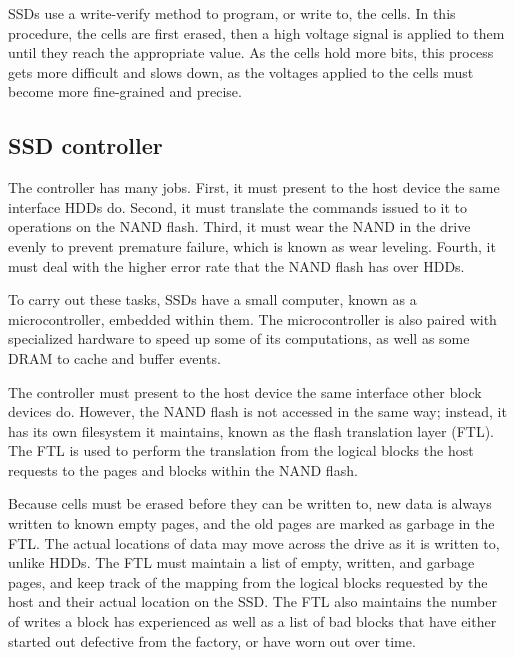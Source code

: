 \documentclass[format=acmsmall, review=false, screen=true]{acmart}
\begin{document}
SSDs use a write-verify method to program, or write to, the cells. In this procedure, the cells are first erased, then 
a high voltage signal is applied to them until they reach the appropriate value. As the cells hold more bits, this 
process gets more difficult and slows down, as the voltages applied to the cells must become more fine-grained and precise.
\cite{Dirik2009, Cornwell2012, Micheloni2013, Chen2016}

\subsection{SSD controller}

The controller has many jobs. First, it must present to the host device the same interface HDDs do. Second, it must 
translate the commands issued to it to operations on the NAND flash. Third, it must wear the NAND in the drive evenly 
to prevent premature failure, which is known as wear leveling. Fourth, it must deal with the higher error rate that 
the NAND flash has over HDDs. \cite{Dirik2009, Cornwell2012, Micheloni2013, MatejFucek2014, Chen2016}

To carry out these tasks, SSDs have a small computer, known as a microcontroller, embedded within them. The microcontroller 
is also paired with specialized hardware to speed up some of its computations, as well as some DRAM to cache and buffer 
events. \cite{Dirik2009, Cornwell2012, Micheloni2013, MatejFucek2014, Chen2016}

The controller must present to the host device the same interface other block devices do. However, the NAND flash is not 
accessed in the same way; instead, it has its own filesystem it maintains, known as the flash translation layer (FTL). 
The FTL is used to perform the translation from the logical blocks the host requests to the pages and blocks within the 
NAND flash. \cite{Cornwell2012, Micheloni2013, MatejFucek2014, Chen2016}

Because cells must be erased before they can be written to, new data is always written to known empty pages, and the old 
pages are marked as garbage in the FTL. The actual locations of data may move across the drive as it is written to, unlike 
HDDs. The FTL must maintain a list of empty, written, and garbage pages, and keep track of the mapping from the logical 
blocks requested by the host and their actual location on the SSD. The FTL also maintains the number of writes a block 
has experienced as well as a list of bad blocks that have either started out defective from the factory, or have worn out 
over time. \cite{Dirik2009, Cornwell2012, Micheloni2013, MatejFucek2014, Chen2016}
\end{document}
